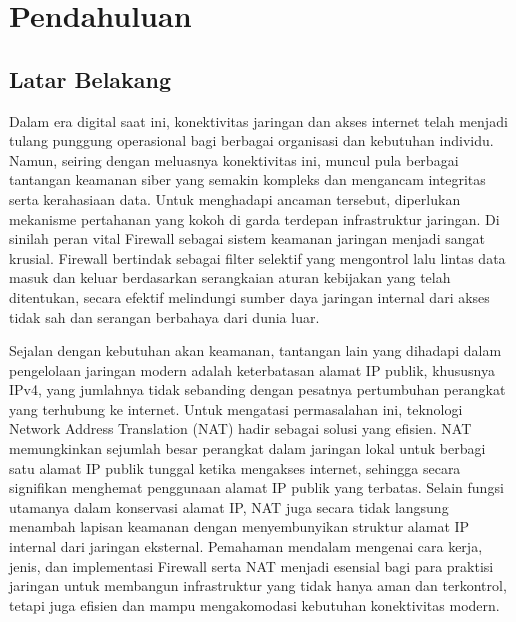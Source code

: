 \section{Pendahuluan}
\subsection{Latar Belakang}
Dalam era digital saat ini, konektivitas jaringan dan akses internet telah menjadi tulang punggung operasional bagi berbagai organisasi dan kebutuhan individu. Namun, seiring dengan meluasnya konektivitas ini, muncul pula berbagai tantangan keamanan siber yang semakin kompleks dan mengancam integritas serta kerahasiaan data. Untuk menghadapi ancaman tersebut, diperlukan mekanisme pertahanan yang kokoh di garda terdepan infrastruktur jaringan. Di sinilah peran vital Firewall sebagai sistem keamanan jaringan menjadi sangat krusial. Firewall bertindak sebagai filter selektif yang mengontrol lalu lintas data masuk dan keluar berdasarkan serangkaian aturan kebijakan yang telah ditentukan, secara efektif melindungi sumber daya jaringan internal dari akses tidak sah dan serangan berbahaya dari dunia luar.

Sejalan dengan kebutuhan akan keamanan, tantangan lain yang dihadapi dalam pengelolaan jaringan modern adalah keterbatasan alamat IP publik, khususnya IPv4, yang jumlahnya tidak sebanding dengan pesatnya pertumbuhan perangkat yang terhubung ke internet. Untuk mengatasi permasalahan ini, teknologi Network Address Translation (NAT) hadir sebagai solusi yang efisien. NAT memungkinkan sejumlah besar perangkat dalam jaringan lokal untuk berbagi satu alamat IP publik tunggal ketika mengakses internet, sehingga secara signifikan menghemat penggunaan alamat IP publik yang terbatas. Selain fungsi utamanya dalam konservasi alamat IP, NAT juga secara tidak langsung menambah lapisan keamanan dengan menyembunyikan struktur alamat IP internal dari jaringan eksternal. Pemahaman mendalam mengenai cara kerja, jenis, dan implementasi Firewall serta NAT menjadi esensial bagi para praktisi jaringan untuk membangun infrastruktur yang tidak hanya aman dan terkontrol, tetapi juga efisien dan mampu mengakomodasi kebutuhan konektivitas modern.

